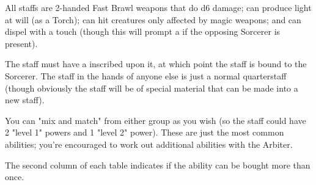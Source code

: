 {All staffs are 2-handed Fast Brawl weapons that do d6 damage; can produce light at will (as a Torch); can hit creatures only affected by magic weapons; and can dispel  with a touch (though this will  prompt a  if the opposing Sorcerer is present).

The staff must have a  inscribed upon it, at which point the staff is bound to the Sorcerer. The staff in the hands of anyone else is just a normal quarterstaff (though obviously the staff will be of special material that can be made into a new staff). 

You can "mix and match" from either group as you wish (so the staff could have 2 "level 1" powers and 1 "level 2" power). These are just the most common abilities; you're encouraged to work out additional abilities with the Arbiter.

The second column of each table indicates if the ability can be bought more than once.













}
